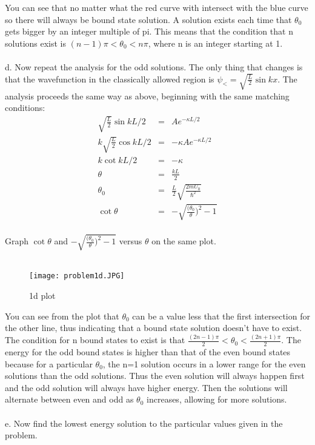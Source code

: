 \documentclass[11pt]{amsart}
\begin{document}
You can see that no matter what the red curve with intersect with the blue curve so there will always be bound state solution. A solution exists each time that $\theta_{0}$ gets bigger by an integer multiple of pi. This means that the condition that n solutions exist is $(n-1)\pi<\theta_{0}<n\pi$, where n is an integer starting at 1. \\ \\
d. Now repeat the analysis for the odd solutions. The only thing that changes is that the wavefunction in the classically allowed region is $\psi_{<}=\sqrt{\frac{L}{2}}\sin{kx}$. The analysis proceeds the same way as above, beginning with the same matching conditions: \\
\begin{eqnarray*} 
\sqrt{\frac{L}{2}}\sin{kL/2} &=& Ae^{-\kappa{L/2}} \\
k\sqrt{\frac{L}{2}}\cos{kL/2} &=&  -\kappa{A}e^{-\kappa{L/2}} \\
k\cot{kL/2} &=& -\kappa \\
\theta &=& \frac{kL}{2} \\
\theta_{0}&=&\frac{L}{2}\sqrt{\frac{2mU_{0}}{\hbar^{2}}} \\
\cot{\theta} &=& -\sqrt{\frac{(\theta_{0}}{\theta})^{2}-1} 
\end{eqnarray*} \\
Graph $\cot{\theta}$ and $-\sqrt{\frac{(\theta_{0}}{\theta})^{2}-1}$  versus $\theta$ on the same plot. \\ \\
\begin{figure}[htb]
\texttt{[image: problem1d.JPG]}
\caption{1d plot}
\label{problem1d}
\end{figure} 
You can see from the plot that $\theta_{0}$ can be a value less that the first intersection for the other line, thus indicating that a bound state solution doesn't have to exist. The condition for n bound states to exist is that $\frac{(2n-1)\pi}{2}<\theta_{0}<\frac{(2n+1)\pi}{2}$. The energy for the odd bound states is higher than that of the even bound states because for a particular $\theta_{0}$, the n=1 solution occurs in a lower range for the even solutions than the odd solutions. Thus the even solution will always happen first and the odd solution will always have higher energy. Then the solutions will alternate between even and odd as $\theta_{0}$ increases, allowing for more solutions. \\ \\
e. Now find the lowest energy solution to the particular values given in the problem. \\
\end{document}
